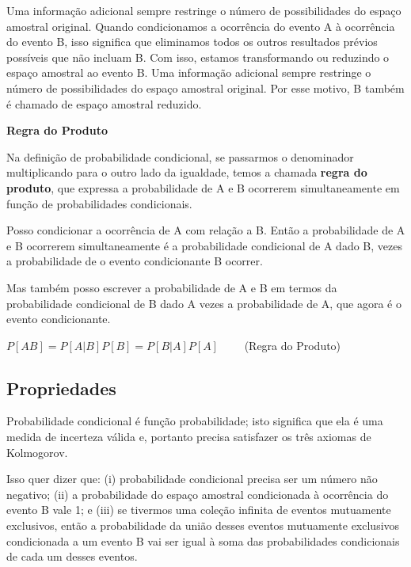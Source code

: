 \documentclass[
]{book}
\theoremstyle{definition}
\theoremstyle{definition}
\theoremstyle{definition}
\theoremstyle{remark}
\begin{document}
Uma informação adicional sempre restringe o número de possibilidades do espaço amostral original. Quando condicionamos a ocorrência do evento A à ocorrência do evento B, isso significa que eliminamos todos os outros resultados prévios possíveis que não incluam B. Com isso, estamos transformando ou reduzindo o espaço amostral ao evento B. Uma informação adicional sempre restringe o número de possibilidades do espaço amostral original. Por esse motivo, B também é chamado de espaço amostral reduzido.

\textbf{Regra do Produto}

Na definição de probabilidade condicional, se passarmos o denominador multiplicando para o outro lado da igualdade, temos a chamada \textbf{regra do produto}, que expressa a probabilidade de A e B ocorrerem simultaneamente em função de probabilidades condicionais.

Posso condicionar a ocorrência de A com relação a B. Então a probabilidade de A e B ocorrerem simultaneamente é a probabilidade condicional de A dado B, vezes a probabilidade de o evento condicionante B ocorrer.

Mas também posso escrever a probabilidade de A e B em termos da probabilidade condicional de B dado A vezes a probabilidade de A, que agora é o evento condicionante.

\(P[AB] = P[A|B] P[B] = P[B|A] P[A] \qquad\) (Regra do Produto)

\hypertarget{propriedades}{%
\subsection*{Propriedades}\label{propriedades}}

Probabilidade condicional é função probabilidade; isto significa que ela é uma medida de incerteza válida e, portanto precisa satisfazer os três axiomas de Kolmogorov.

Isso quer dizer que: (i) probabilidade condicional precisa ser um número não negativo; (ii) a probabilidade do espaço amostral condicionada à ocorrência do evento B vale 1; e (iii) se tivermos uma coleção infinita de eventos mutuamente exclusivos, então a probabilidade da união desses eventos mutuamente exclusivos condicionada a um evento B vai ser igual à soma das probabilidades condicionais de cada um desses eventos.
\end{document}
